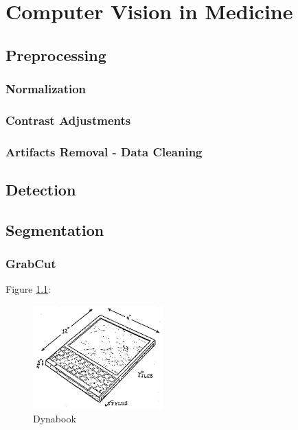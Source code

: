 \chapter{Computer Vision in Medicine}

\section{Preprocessing}

\subsection{Normalization}

\subsection{Contrast Adjustments}

\subsection{Artifacts Removal - Data Cleaning}

\section{Detection}

\section{Segmentation}

\subsection{GrabCut}

Figure \ref{fig:dynabook}:

\begin{figure}[h]
\begin{centering}
\includegraphics[width=5cm]{assets/images/Dynabook}
\par\end{centering}
\caption{Dynabook \label{fig:dynabook}}
\end{figure}